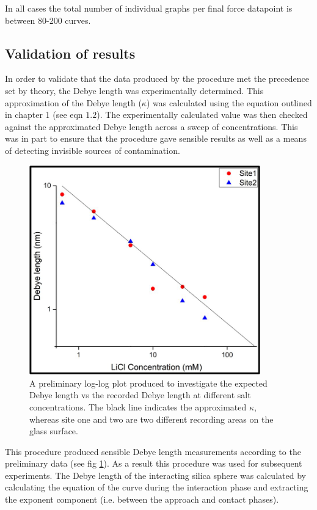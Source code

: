 In all cases the total number of individual graphs per final force datapoint is between 80-200 curves.

\subsection{Validation of results}

In order to validate that the data produced by the procedure met the precedence set by theory, the Debye length was experimentally determined. This approximation of the Debye length ($\kappa$) was calculated using the equation outlined in chapter 1 (see eqn $1.2$). The experimentally calculated value was then checked against the approximated Debye length across a sweep of concentrations. This was in part to ensure that the procedure gave sensible results as well as a means of detecting invisible sources of contamination.

\begin{figure}[h!!]    
        \begin{center}
          \includegraphics[width=100mm]{chapter4/DebyeLength.png}
\end{center}
\caption{A preliminary log-log plot produced to investigate the expected Debye length vs the recorded Debye length at different salt concentrations. The black line indicates the approximated $\kappa$, whereas site one and two are two different recording areas on the glass surface.}
\label{fig:DebyeLength}                 
\end{figure}

This procedure produced sensible Debye length measurements according to the preliminary data (see fig \ref{fig:DebyeLength}). As a result this procedure was used for subsequent experiments. The Debye length of the interacting silica sphere was calculated by calculating the equation of the curve during the interaction phase and extracting the exponent component (i.e. between the approach and contact phases).

